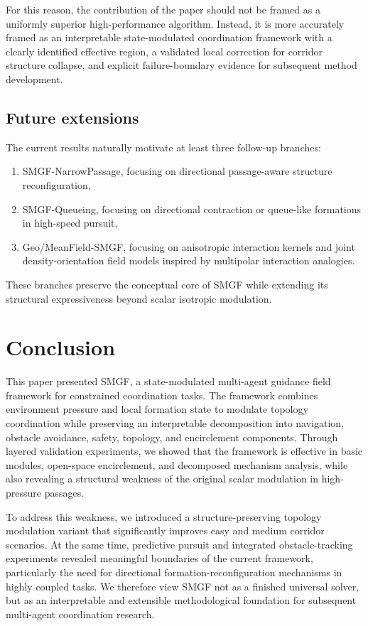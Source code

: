 \documentclass[utf8]{FrontiersinHarvard}
\begin{document}
For this reason, the contribution of the paper should not be framed as a uniformly superior high-performance algorithm. Instead, it is more accurately framed as an interpretable state-modulated coordination framework with a clearly identified effective region, a validated local correction for corridor structure collapse, and explicit failure-boundary evidence for subsequent method development.

\subsection{Future extensions}

The current results naturally motivate at least three follow-up branches:

\begin{enumerate}
    \item SMGF-NarrowPassage, focusing on directional passage-aware structure reconfiguration,
    \item SMGF-Queueing, focusing on directional contraction or queue-like formations in high-speed pursuit,
    \item Geo/MeanField-SMGF, focusing on anisotropic interaction kernels and joint density-orientation field models inspired by multipolar interaction analogies.
\end{enumerate}

These branches preserve the conceptual core of SMGF while extending its structural expressiveness beyond scalar isotropic modulation.

\section{Conclusion}

This paper presented SMGF, a state-modulated multi-agent guidance field framework for constrained coordination tasks. The framework combines environment pressure and local formation state to modulate topology coordination while preserving an interpretable decomposition into navigation, obstacle avoidance, safety, topology, and encirclement components. Through layered validation experiments, we showed that the framework is effective in basic modules, open-space encirclement, and decomposed mechanism analysis, while also revealing a structural weakness of the original scalar modulation in high-pressure passages.

To address this weakness, we introduced a structure-preserving topology modulation variant that significantly improves easy and medium corridor scenarios. At the same time, predictive pursuit and integrated obstacle-tracking experiments revealed meaningful boundaries of the current framework, particularly the need for directional formation-reconfiguration mechanisms in highly coupled tasks. We therefore view SMGF not as a finished universal solver, but as an interpretable and extensible methodological foundation for subsequent multi-agent coordination research.
\end{document}
